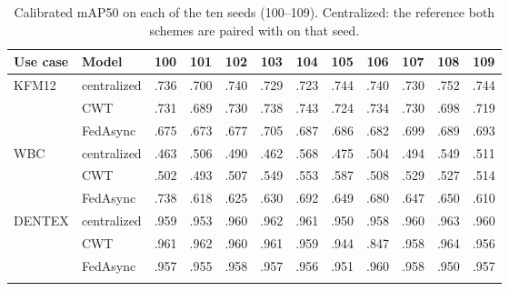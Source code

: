 \documentclass[pdflatex,sn-mathphys-num]{sn-jnl}
\begin{document}
\begin{appendices}
\begin{table}[h]
\caption{Calibrated mAP50 on each of the ten seeds (100--109). Centralized: the reference both schemes are paired with on that seed.}\label{tab:seeds}
\footnotesize
\setlength{\tabcolsep}{2.5pt}
\begin{tabular*}{\textwidth}{@{\extracolsep\fill}llcccccccccc}
\toprule
Use case & Model & 100 & 101 & 102 & 103 & 104 & 105 & 106 & 107 & 108 & 109 \\
\midrule
KFM12 & centralized & .736 & .700 & .740 & .729 & .723 & .744 & .740 & .730 & .752 & .744 \\
 & CWT & .731 & .689 & .730 & .738 & .743 & .724 & .734 & .730 & .698 & .719 \\
 & FedAsync & .675 & .673 & .677 & .705 & .687 & .686 & .682 & .699 & .689 & .693 \\
\addlinespace
WBC & centralized & .463 & .506 & .490 & .462 & .568 & .475 & .504 & .494 & .549 & .511 \\
 & CWT & .502 & .493 & .507 & .549 & .553 & .587 & .508 & .529 & .527 & .514 \\
 & FedAsync & .738 & .618 & .625 & .630 & .692 & .649 & .680 & .647 & .650 & .610 \\
\addlinespace
DENTEX & centralized & .959 & .953 & .960 & .962 & .961 & .950 & .958 & .960 & .963 & .960 \\
 & CWT & .961 & .962 & .960 & .961 & .959 & .944 & .847 & .958 & .964 & .956 \\
 & FedAsync & .957 & .955 & .958 & .957 & .956 & .951 & .960 & .958 & .950 & .957 \\
\botrule
\end{tabular*}
\end{table}


\end{appendices}
\end{document}
